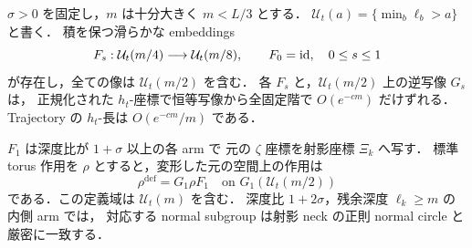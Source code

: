 \begin{proposition}
\label{ke:three-arm-coordinate-interpolation}
$\sigma>0$ を固定し，$m$ は十分大きく $m<L/3$ とする．
$\mathcal U_t(a)=\{\min_b\ell_b>a\}$ と書く．
積を保つ滑らかな embeddings
\[
 F_s:\mathcal U_t(m/4)\longrightarrow\mathcal U_t(m/8),
 \qquad F_0=\operatorname{id},\quad 0\le s\le1
\]
が存在し，全ての像は $\mathcal U_t(m/2)$ を含む．
各 $F_s$ と，$\mathcal U_t(m/2)$ 上の逆写像 $G_s$ は，
正規化された $h_t$-座標で恒等写像から全固定階で $O(e^{-cm})$ だけずれる．
Trajectory の $h_t$-長は $O(e^{-cm}/m)$ である．

$F_1$ は深度比が $1+\sigma$ 以上の各 arm で
元の $\zeta$ 座標を射影座標 $\Xi_k$ へ写す．
標準 torus 作用を $\rho$ とすると，変形した元の空間上の作用は
\begin{equation}\label{ke:eq:deformed-action-direction}
 \rho^{\mathrm{def}}=G_1\rho F_1
 \quad\text{on }G_1(\mathcal U_t(m/2))
\end{equation}
である．この定義域は $\mathcal U_t(m)$ を含む．
深度比 $1+2\sigma$，残余深度 $\ell_k\ge m$ の内側 arm では，
対応する normal subgroup は射影 neck の正則 normal circle と厳密に一致する．
\end{proposition}
